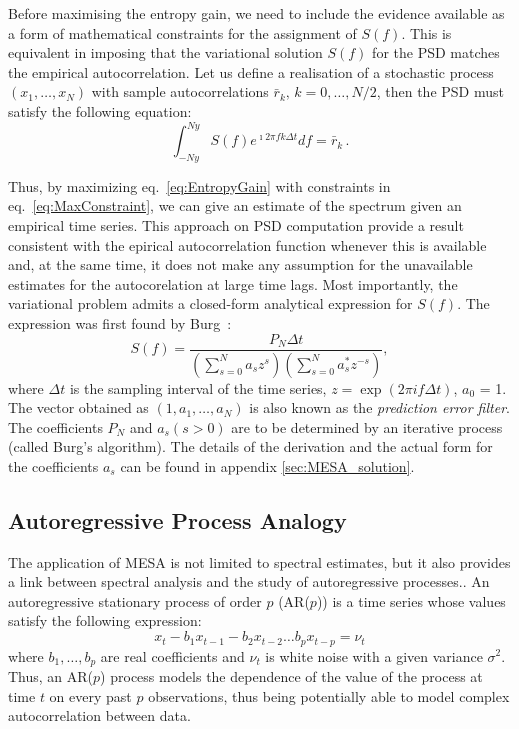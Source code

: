 \documentclass[twocolumn,showpacs,preprintnumbers,nofootinbib,prd,
superscriptaddress,10pt]{revtex4-1}
\begin{document}
Before maximising the entropy gain, we need to include the evidence available as a form of mathematical constraints for the assignment of $S(f)$.
This is equivalent in imposing that the variational solution $S(f)$ for the PSD matches the empirical autocorrelation.
Let us define a realisation of a stochastic process $(x_1,\ldots,x_N)$ with sample autocorrelations $\bar r_k,\,k=0,\ldots, N/2$, then the PSD must satisfy the following equation:
\begin{equation}\label{eq:MaxConstraint}
\int_{-Ny}^{Ny} S(f) e^{\imath 2 \pi f k \Delta t} df = \bar r_{k}\,.
\end{equation}

Thus, by maximizing eq.~\eqref{eq:EntropyGain} with constraints in eq.~\eqref{eq:MaxConstraint}, we can give an estimate of the spectrum given an empirical time series.
This approach on PSD computation provide a result consistent with the epirical autocorrelation function whenever this is available and, at the same time, it does not make any assumption for the unavailable estimates for the autocorelation at large time lags.
Most importantly, the variational problem admits a closed-form analytical expression for $S(f)$.
The expression was first found by Burg~\cite{burg1975maximum}:
\begin{equation}\label{eq:MESApsd}
    S(f) = \frac{P_N \Delta t}{\left(\sum_{s=0}^N a_s z^s\right)\left(\sum_{s = 0}^N a^*_s z^{-s}\right)}, 
\end{equation}
where $\Delta t$ is the sampling interval of the time series, $z=\exp{(2\pi i f\Delta t)}$, $a_0$ = 1.
The vector obtained as $(1, a_1, \dots, a_N)$ is also known as the \textit{prediction error filter}.
The coefficients $P_N$ and $a_s (s > 0)$ are to be determined by an iterative process (called Burg's algorithm). The details of the derivation and the actual form for the coefficients $a_s$ can be found in appendix \ref{sec:MESA_solution}.

\subsection{Autoregressive Process Analogy} \label{sec:autoregr}

The application of MESA is not limited to spectral estimates, but it also provides a link between spectral analysis and the study
of autoregressive processes.\cite{doi:10.1029/RG013i001p00183}.
An autoregressive stationary process of order $p$ (AR($p$)) is a time series whose values satisfy the following expression: 
\begin{equation} \label{eq:AR_p}
    x_t - b_1 x_{t-1} - b_2 x_{t-2} \dots b_p x_{t - p} = \nu_t
\end{equation}
where $b_1, \ldots, b_p$ are real coefficients and $\nu_t$ is white noise with a given variance $\sigma^2$.
Thus, an AR($p$) process models the dependence of the value of the process at time $t$ on every past $p$ observations, 
thus being potentially able to model complex autocorrelation between data.
\end{document}
